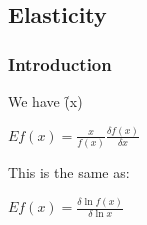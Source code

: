 
\subsection{Elasticity}

\subsubsection{Introduction}

We have \f(x)\)

\(Ef(x)=\frac{x}{f(x)}\frac{\delta f(x)}{\delta x}\)

This is the same as:

\(Ef(x)=\frac{\delta \ln f(x)}{\delta \ln x}\)

